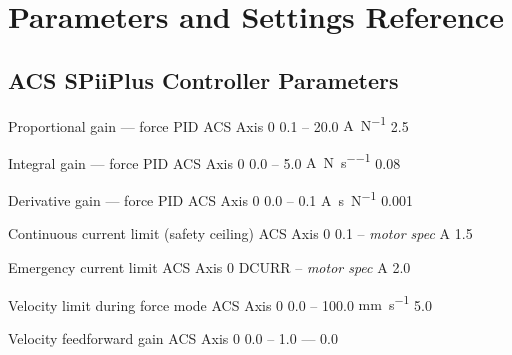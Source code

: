 
\section{Parameters and Settings Reference}
\label{sec:parameters}


\subsection{ACS SPiiPlus Controller Parameters}
\label{sec:params:acs}

\begin{paramtable}

    {Proportional gain — force PID}
    {ACS Axis 0}
    {0.1 – 20.0}
    {\si{\ampere\per\newton}}
    {2.5}

    {Integral gain — force PID}
    {ACS Axis 0}
    {0.0 – 5.0}
    {\si{\ampere\per\newton\per\second}}
    {0.08}

    {Derivative gain — force PID}
    {ACS Axis 0}
    {0.0 – 0.1}
    {\si{\ampere\second\per\newton}}
    {0.001}

    {Continuous current limit (safety ceiling)}
    {ACS Axis 0}
    {0.1 – \textit{motor spec}}
    {\si{\ampere}}
    {1.5}

    {Emergency current limit}
    {ACS Axis 0}
    {DCURR – \textit{motor spec}}
    {\si{\ampere}}
    {2.0}

    {Velocity limit during force mode}
    {ACS Axis 0}
    {0.0 – 100.0}
    {\si{\milli\metre\per\second}}
    {5.0}

    {Velocity feedforward gain}
    {ACS Axis 0}
    {0.0 – 1.0}
    {---}
    {0.0}

\end{paramtable}


